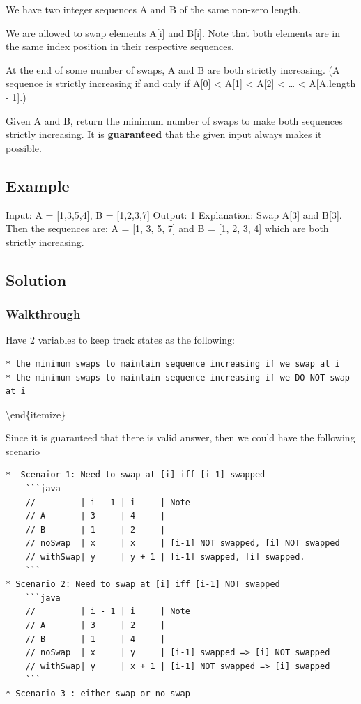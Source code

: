 \documentclass[]{book}
\begin{document}
We have two integer sequences A and B of the same non-zero length.

We are allowed to swap elements A{[}i{]} and B{[}i{]}. Note that both elements are in the same index position in their
respective sequences.

At the end of some number of swaps, A and B are both strictly increasing. (A sequence is strictly increasing
if and only if A{[}0{]} \textless{} A{[}1{]} \textless{} A{[}2{]} \textless{} \ldots{} \textless{} A{[}A.length - 1{]}.)

Given A and B, return the minimum number of swaps to make both sequences strictly increasing. It is
\textbf{guaranteed} that the given input always makes it possible.

\hypertarget{example-36}{%
\subsection{Example}\label{example-36}}

Input: A = {[}1,3,5,4{]}, B = {[}1,2,3,7{]} Output: 1
Explanation:
Swap A{[}3{]} and B{[}3{]}. Then the sequences are: A = {[}1, 3, 5, 7{]} and B = {[}1, 2, 3, 4{]} which are both strictly
increasing.

\hypertarget{solution-30}{%
\subsection{Solution}\label{solution-30}}

\hypertarget{walkthrough-36}{%
\subsubsection{Walkthrough}\label{walkthrough-36}}

Have 2 variables to keep track states as the following:

\begin{verbatim}
* the minimum swaps to maintain sequence increasing if we swap at i
* the minimum swaps to maintain sequence increasing if we DO NOT swap at i
\end{verbatim}

\textbackslash{}end\{itemize\}

Since it is guaranteed that there is valid answer, then we could have the following scenario

\begin{verbatim}
*  Scenaior 1: Need to swap at [i] iff [i-1] swapped
    ```java
    //         | i - 1 | i     | Note
    // A       | 3     | 4     |
    // B       | 1     | 2     |
    // noSwap  | x     | x     | [i-1] NOT swapped, [i] NOT swapped
    // withSwap| y     | y + 1 | [i-1] swapped, [i] swapped.
    ```
* Scenario 2: Need to swap at [i] iff [i-1] NOT swapped
    ```java
    //         | i - 1 | i     | Note
    // A       | 3     | 2     |
    // B       | 1     | 4     |
    // noSwap  | x     | y     | [i-1] swapped => [i] NOT swapped
    // withSwap| y     | x + 1 | [i-1] NOT swapped => [i] swapped
    ```
* Scenario 3 : either swap or no swap
\end{verbatim}
\end{document}
